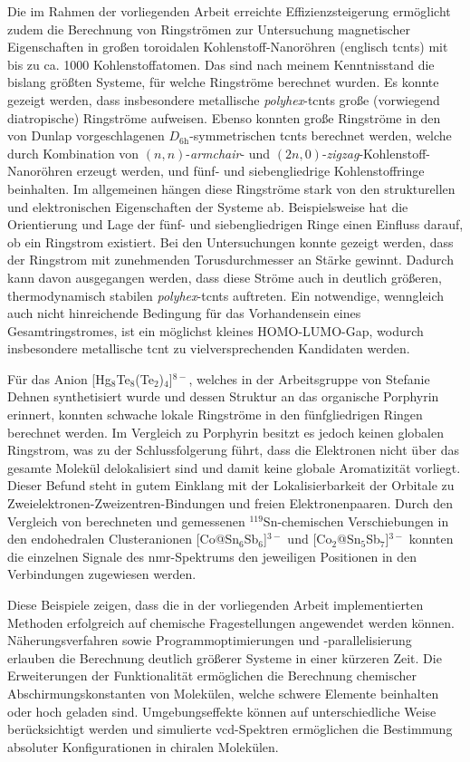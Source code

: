 \bigskip
Die im Rahmen der vorliegenden Arbeit erreichte Effizienzsteigerung ermöglicht zudem die Berechnung von Ringströmen zur Untersuchung magnetischer Eigenschaften in großen toroidalen Kohlenstoff-Nanoröhren (englisch \acfp{tcnt}) mit bis zu ca. 1000 Kohlenstoffatomen. Das sind nach meinem Kenntnisstand die bislang größten Systeme, für welche Ringströme berechnet wurden. Es konnte gezeigt werden, dass insbesondere metallische \textit{polyhex}-\acp{tcnt} große (vorwiegend diatropische) Ringströme aufweisen. Ebenso konnten große Ringströme in den von Dunlap vorgeschlagenen $D_{\text{6h}}$-symmetrischen \acp{tcnt} berechnet werden, welche durch Kombination von $(n,n)$-\textit{armchair}- und $(2n,0)$-\textit{zigzag}-Kohlenstoff-Nanoröhren erzeugt werden, und fünf- und siebengliedrige Kohlenstoffringe beinhalten. Im allgemeinen hängen diese Ringströme stark von den strukturellen und elektronischen Eigenschaften der Systeme ab. Beispielsweise hat die Orientierung und Lage der fünf- und siebengliedrigen Ringe einen Einfluss darauf, ob ein Ringstrom existiert. Bei den Untersuchungen konnte gezeigt werden, dass der Ringstrom mit zunehmenden Torusdurchmesser an Stärke gewinnt. Dadurch kann davon ausgegangen werden, dass diese Ströme auch in deutlich größeren, thermodynamisch stabilen \textit{polyhex}-\acp{tcnt} auftreten. Ein notwendige, wenngleich auch nicht hinreichende Bedingung für das Vorhandensein eines Gesamtringstromes, ist ein möglichst kleines HOMO-LUMO-Gap, wodurch insbesondere metallische \ac{tcnt} zu vielversprechenden Kandidaten werden.

Für das Anion [Hg$_8$Te$_8$(Te$_2$)$_4$]$^{8-}$, welches in der Arbeitsgruppe von Stefanie Dehnen synthetisiert wurde und dessen Struktur an das organische Porphyrin erinnert, konnten schwache lokale Ringströme in den fünfgliedrigen Ringen berechnet werden. Im Vergleich zu Porphyrin besitzt es jedoch keinen globalen Ringstrom, was zu der Schlussfolgerung führt, dass die Elektronen nicht über das gesamte Molekül delokalisiert sind und damit keine globale Aromatizität vorliegt. Dieser Befund steht in gutem Einklang mit der Lokalisierbarkeit der Orbitale zu Zweielektronen-Zweizentren-Bindungen und freien Elektronenpaaren.
Durch den Vergleich von berechneten und gemessenen $^{119}$Sn-chemischen Verschiebungen in den endohedralen Clusteranionen [Co@Sn$_6$Sb$_6$]$^{3-}$ und [Co$_2$@Sn$_5$Sb$_7$]$^{3-}$ konnten die einzelnen Signale des \ac{nmr}-Spektrums den jeweiligen Positionen in den Verbindungen zugewiesen werden.

\bigskip
Diese Beispiele zeigen, dass die in der vorliegenden Arbeit implementierten Methoden erfolgreich auf chemische Fragestellungen angewendet werden können. Näherungsverfahren sowie Programmoptimierungen und -parallelisierung erlauben die Berechnung deutlich größerer Systeme in einer kürzeren Zeit. Die Erweiterungen der Funktionalität ermöglichen die Berechnung chemischer Abschirmungskonstanten von Molekülen, welche schwere Elemente beinhalten oder hoch geladen sind. Umgebungseffekte können auf unterschiedliche Weise berücksichtigt werden und simulierte \ac{vcd}-Spektren ermöglichen die Bestimmung absoluter Konfigurationen in chiralen Molekülen.


